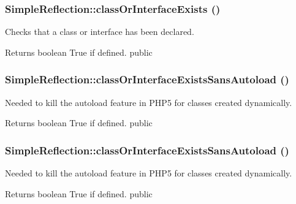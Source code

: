 \hypertarget{class_simple_reflection_af18aa4a7e354dcf43a5423b27a2a8760}{
\subsubsection[{classOrInterfaceExists}]{\setlength{\rightskip}{0pt plus 5cm}SimpleReflection::classOrInterfaceExists ()}}
\label{class_simple_reflection_af18aa4a7e354dcf43a5423b27a2a8760}
Checks that a class or interface has been declared. \begin{DoxyReturn}{Returns}
boolean True if defined.  public 
\end{DoxyReturn}
\hypertarget{class_simple_reflection_acea353e896b1cd11e7f11fc618297238}{
\subsubsection[{classOrInterfaceExistsSansAutoload}]{\setlength{\rightskip}{0pt plus 5cm}SimpleReflection::classOrInterfaceExistsSansAutoload ()}}
\label{class_simple_reflection_acea353e896b1cd11e7f11fc618297238}
Needed to kill the autoload feature in PHP5 for classes created dynamically. \begin{DoxyReturn}{Returns}
boolean True if defined.  public 
\end{DoxyReturn}
\hypertarget{class_simple_reflection_acea353e896b1cd11e7f11fc618297238}{
\subsubsection[{classOrInterfaceExistsSansAutoload}]{\setlength{\rightskip}{0pt plus 5cm}SimpleReflection::classOrInterfaceExistsSansAutoload ()}}
\label{class_simple_reflection_acea353e896b1cd11e7f11fc618297238}
Needed to kill the autoload feature in PHP5 for classes created dynamically. \begin{DoxyReturn}{Returns}
boolean True if defined.  public 
\end{DoxyReturn}
